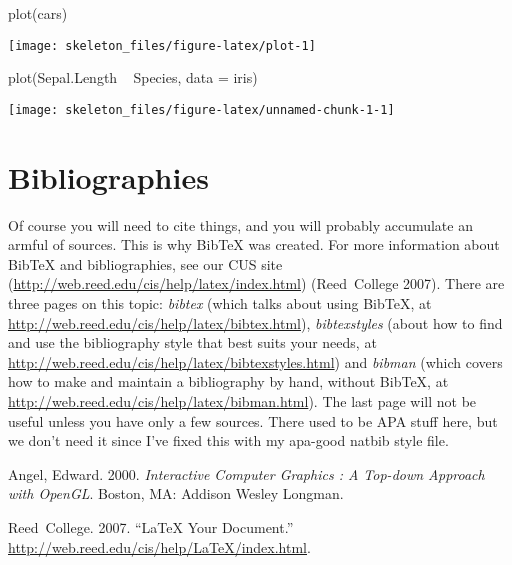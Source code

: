 \documentclass[12pt,twoside]{reedthesis}
\begin{document}
  \begin{CodeChunk}
  \begin{CodeInput}
  plot(cars)
  \end{CodeInput}


  \begin{center}\texttt{[image: skeleton\_files/figure-latex/plot-1]} \end{center}

  \end{CodeChunk}

  \begin{CodeChunk}
  \begin{CodeInput}
  plot(Sepal.Length ~ Species, data = iris)
  \end{CodeInput}


  \begin{center}\texttt{[image: skeleton\_files/figure-latex/unnamed-chunk-1-1]} \end{center}

  \end{CodeChunk}

  \section{Bibliographies}

  Of course you will need to cite things, and you will probably accumulate
  an armful of sources. This is why BibTeX was created. For more
  information about BibTeX and bibliographies, see our CUS site
  (\url{http://web.reed.edu/cis/help/latex/index.html})\cite{reedweb2007}
  (Reed~College 2007). There are three pages on this topic: \emph{bibtex}
  (which talks about using BibTeX, at
  \url{http://web.reed.edu/cis/help/latex/bibtex.html}),
  \emph{bibtexstyles} (about how to find and use the bibliography style
  that best suits your needs, at
  \url{http://web.reed.edu/cis/help/latex/bibtexstyles.html}) and
  \emph{bibman} (which covers how to make and maintain a bibliography by
  hand, without BibTeX, at
  \url{http://web.reed.edu/cis/help/latex/bibman.html}). The last page
  will not be useful unless you have only a few sources. There used to be
  APA stuff here, but we don't need it since I've fixed this with my
  apa-good natbib style file.

  Angel, Edward. 2000. \emph{Interactive Computer Graphics : A Top-down
  Approach with OpenGL}. Boston, MA: Addison Wesley Longman.

  Reed~College. 2007. ``LaTeX Your Document.''
  \url{http://web.reed.edu/cis/help/LaTeX/index.html}.

\printbibliography

\end{document}
